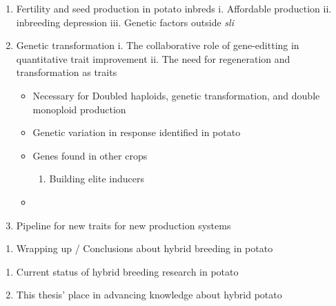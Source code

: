 \documentclass[
]{report}
\providecommand{\tightlist}{%
  \setlength{\itemsep}{0pt}\setlength{\parskip}{0pt}}\usepackage{longtable,booktabs,array}
\begin{document}
\begin{enumerate}
\def\labelenumi{\alph{enumi}.}
\tightlist
\item
  Fertility and seed production in potato inbreds i. Affordable
  production ii. inbreeding depression iii. Genetic factors outside
  \emph{sli}
\item
  Genetic transformation i. The collaborative role of gene-editting in
  quantitative trait improvement ii. The need for regeneration and
  transformation as traits

  \begin{itemize}
  \tightlist
  \item
    Necessary for Doubled haploids, genetic transformation, and double
    monoploid production
  \item
    Genetic variation in response identified in potato
  \item
    Genes found in other crops \autocite{Koornneef1993}

    \begin{enumerate}
    \def\labelenumii{\roman{enumii}.}
    \setcounter{enumii}{2}
    \tightlist
    \item
      Building elite inducers
    \end{enumerate}
  \item
    \autocite{Delzer2024}
  \end{itemize}
\item
  Pipeline for new traits for new production systems
\end{enumerate}

\begin{enumerate}
\def\labelenumi{\arabic{enumi}.}
\setcounter{enumi}{4}
\tightlist
\item
  Wrapping up / Conclusions about hybrid breeding in potato
\end{enumerate}

\begin{enumerate}
\def\labelenumi{\alph{enumi}.}
\tightlist
\item
  Current status of hybrid breeding research in potato
\item
  This thesis' place in advancing knowledge about hybrid potato
\end{enumerate}


\printbibliography
\end{document}
